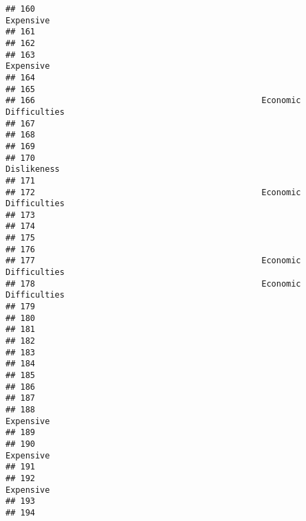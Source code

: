 \documentclass[
]{article}
\begin{document}
\begin{verbatim}
## 160                                                          Expensive 
## 161                                                                    
## 162                                                                    
## 163                                                          Expensive 
## 164                                                                    
## 165                                                                    
## 166                                              Economic Difficulties 
## 167                                                                    
## 168                                                                    
## 169                                                                    
## 170                                                        Dislikeness 
## 171                                                                    
## 172                                              Economic Difficulties 
## 173                                                                    
## 174                                                                    
## 175                                                                    
## 176                                                                    
## 177                                              Economic Difficulties 
## 178                                              Economic Difficulties 
## 179                                                                    
## 180                                                                    
## 181                                                                    
## 182                                                                    
## 183                                                                    
## 184                                                                    
## 185                                                                    
## 186                                                                    
## 187                                                                    
## 188                                                          Expensive 
## 189                                                                    
## 190                                                          Expensive 
## 191                                                                    
## 192                                                          Expensive 
## 193                                                                    
## 194                                                                    

\end{verbatim}
\end{document}
